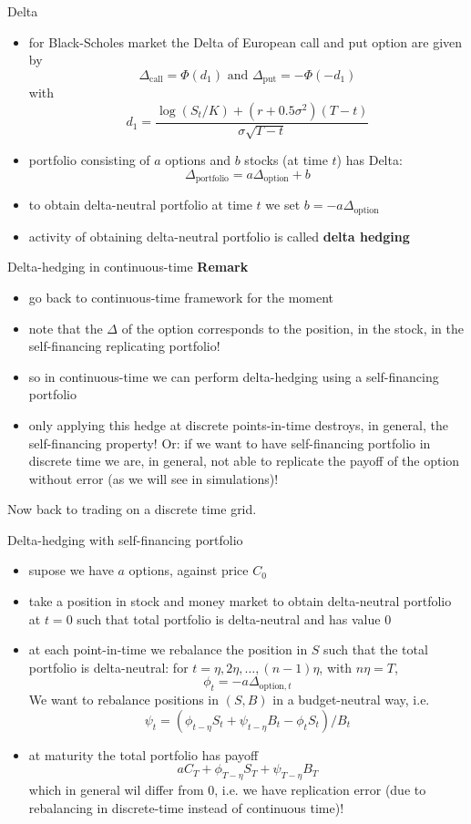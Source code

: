 \documentclass[pdf, handout]{beamer}
\begin{document}
\begin{frame}{Delta}
\begin{itemize}
\item for Black-Scholes market the Delta of European call and put option are given by
\[
\Delta_{\text{call}} = \Phi(d_1) \text{  and } 
\Delta_{\text{put}} = -\Phi(-d_1)
 \]
with
\[
d_1= \frac{
\log(S_t/K)+(r +0.5 \sigma^2)(T-t)}{\sigma\sqrt{T-t}}
\]
\item portfolio consisting of $a$ options and $b$ stocks (at time $t$) has Delta:
\[
\Delta_{\text{portfolio}} = a \Delta_{\text{option}}
+ b  
\]
\item to obtain delta-neutral portfolio at time $t$ we 
set $b = - a \Delta_{\text{option}}$
\item activity of obtaining delta-neutral portfolio
is called \textbf{delta hedging}
\end{itemize}
\end{frame}

\begin{frame}{Delta-hedging in continuous-time}
\textbf{Remark}
\begin{itemize}
\item go back to continuous-time framework for the moment
\item note that the $\Delta$ of the option corresponds to the
position, in the stock, in the self-financing replicating portfolio!
\item so in continuous-time we can perform delta-hedging using
a self-financing portfolio
\item only applying this hedge at discrete points-in-time
destroys, in general, the self-financing property! Or: if we want to have 
self-financing portfolio in discrete time we are, in general, not able
to replicate the payoff of the option without error
(as we will see in simulations)!
\end{itemize}
Now back to trading on a discrete time grid.
\end{frame}




\begin{frame}{Delta-hedging with self-financing portfolio}
\begin{itemize}
\item supose we have $a$ options, against price $C_0$
\item take a position in stock and money market to obtain delta-neutral portfolio at $t=0$ such that total portfolio is delta-neutral and has value 0
\item at each point-in-time 
we rebalance the position in $S$ such that the total 
portfolio is delta-neutral: for $t=\eta, 2\eta,\dots,(n-1)\eta$, with $n\eta=T$,
\[
\phi_t=  - a\Delta_{\text{option}, t} 
\]
We want to rebalance positions in $(S,B)$ in a budget-neutral way, i.e.
\[
\psi_t = (\phi_{t-\eta} S_t + \psi_{t-\eta} B_t- \phi_t S_t )/B_t
\]
\item at maturity the total portfolio has payoff
\[
aC_T + \phi_{T-\eta} S_T + \psi_{T-\eta} B_T 
\]
which in general wil differ from 0, i.e. we have replication error
(due to rebalancing in discrete-time instead of continuous time)!
\end{itemize}
\end{frame}
\end{document}
